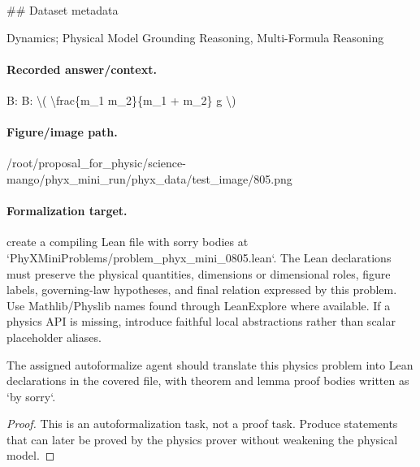 \#\# Dataset metadata

Dynamics; Physical Model Grounding Reasoning, Multi-Formula Reasoning

\paragraph{Recorded answer/context.}
B: B: \textbackslash{}( \textbackslash{}frac\{m\_1 m\_2\}\{m\_1 + m\_2\} g \textbackslash{})

\paragraph{Figure/image path.}
/root/proposal\_for\_physic/science-mango/phyx\_mini\_run/phyx\_data/test\_image/805.png

\paragraph{Formalization target.}
create a compiling Lean file with sorry bodies at `PhyXMiniProblems/problem\_phyx\_mini\_0805.lean`. The Lean declarations must preserve the physical quantities, dimensions or dimensional roles, figure labels, governing-law hypotheses, and final relation expressed by this problem.
Use Mathlib/Physlib names found through LeanExplore where available. If a physics API is missing, introduce faithful local abstractions rather than scalar placeholder aliases.

\begin{theorem}
\label{thm:physics:phyx_mini_0805:target}
The assigned autoformalize agent should translate this physics problem into Lean declarations in the covered file, with theorem and lemma proof bodies written as `by sorry`.
\end{theorem}
\begin{proof}
This is an autoformalization task, not a proof task. Produce statements that can later be proved by the physics prover without weakening the physical model.
\end{proof}

